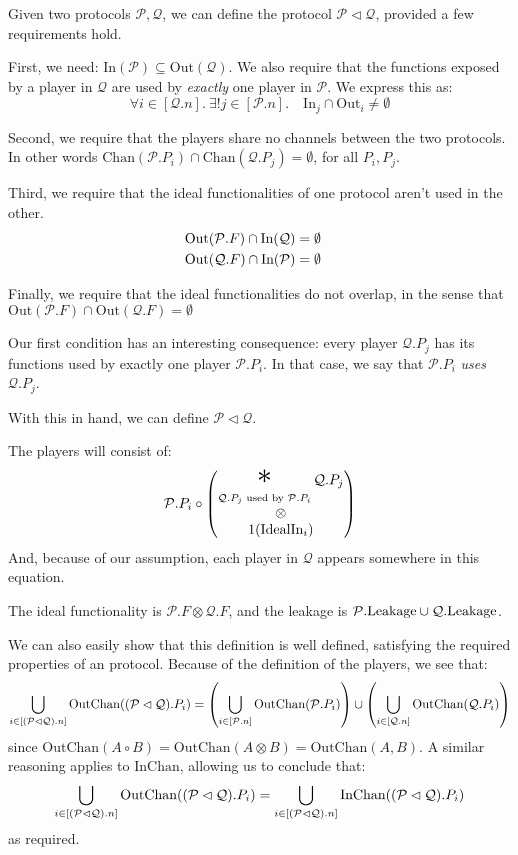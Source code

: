 \begin{definition}
Given two protocols $\mathcal{P}, \mathcal{Q}$,
we can define the protocol $\mathcal{P} \lhd \mathcal{Q}$,
provided a few requirements hold.

First, we need: $\text{In}(\mathcal{P}) \subseteq \text{Out}(\mathcal{Q})$.
We also require that the functions exposed by a player in $\mathcal{Q}$
are used by \emph{exactly} one player in $\mathcal{P}$.
We express this as:
\[
  \forall i \in [\mathcal{Q}.n].\ \exists! j \in [\mathcal{P}.n].\quad \text{In}_j \cap \text{Out}_i \neq \emptyset
\]

Second, we require that the players share no channels between the two
protocols.
In other words $\text{Chan}(\mathcal{P}.P_i) \cap \text{Chan}(\mathcal{Q}.P_j) = \emptyset$, for all $P_i, P_j$.

Third, we require that the ideal functionalities of one protocol aren't used in the other.
$$
\begin{aligned}
&\text{Out}(\mathcal{P}.F) \cap \text{In}(\mathcal{Q}) = \emptyset\cr
&\text{Out}(\mathcal{Q}.F) \cap \text{In}(\mathcal{P}) = \emptyset
\end{aligned}
$$

Finally, we require that the ideal functionalities do not overlap, 
  in the sense that $\text{Out}(\mathcal{P}.F) \cap \text{Out}(\mathcal{Q}.F) = \emptyset$

Our first condition has an interesting consequence: every player $\mathcal{Q}.P_j$
has its functions used by exactly one player $\mathcal{P}.P_i$.
In that case, we say that $\mathcal{P}.P_i$ \emph{uses} $\mathcal{Q}.P_j$.

With this in hand, we can define $\mathcal{P} \lhd \mathcal{Q}$.

The players will consist of:
$$
  \mathcal{P}.P_i \circ
  \begin{pmatrix}
    {\displaystyle \bigast_{\mathcal{Q}.P_j \text{ used by } \mathcal{P}.P_i } \mathcal{Q}.P_j} \cr
    \otimes\cr
    1(\tx{IdealIn}_i)
  \end{pmatrix}
$$
And, because of our assumption, each player in $\mathcal{Q}$ appears
somewhere in this equation.

The ideal functionality is $\mathcal{P}.F \otimes \mathcal{Q}.F$,
and the leakage is $\mathcal{P}.\text{Leakage} \cup \mathcal{Q}.\text{Leakage}$.

We can also easily show that this definition is well defined, satisfying
the required properties of an protocol.
Because of the definition of the players, we see that:
$$
  \bigcup_{i \in [(\mathcal{P} \lhd \mathcal{Q}).n]} \text{OutChan}((\mathcal{P} \lhd \mathcal{Q}).{P_i})
  = \left(\bigcup_{i \in [\mathcal{P}.n]} \text{OutChan}(\mathcal{P}.P_i)\right) \cup
  \left(\bigcup_{i \in [\mathcal{Q}.n]} \text{OutChan}(\mathcal{Q}.P_i)\right)
$$
  since $\text{OutChan}(A \circ B) = \text{OutChan}(A \otimes B) = \text{OutChan}(A, B)$.
A similar reasoning applies to $\text{InChan}$, allowing us to conclude that:
$$
  \bigcup_{i \in [(\mathcal{P} \lhd \mathcal{Q}).n]} \text{OutChan}((\mathcal{P} \lhd \mathcal{Q}).{P_i}) =
  \bigcup_{i \in [(\mathcal{P} \lhd \mathcal{Q}).n]} \text{InChan}((\mathcal{P} \lhd \mathcal{Q}).{P_i})
$$
as required.


\end{definition}
